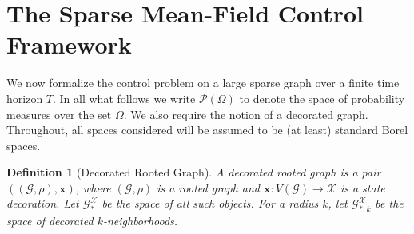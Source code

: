 \documentclass{article}
\newtheorem{definition}{Definition}
\begin{document}
\section{The Sparse Mean-Field Control Framework}
\label{sec:sparse_framework}
We now formalize the control problem on a large sparse graph over a finite time horizon $T$. In all what follows we write $\mathcal{P}(\Omega)$ to denote the space of probability measures over the set $\Omega$.
We also require the notion of a decorated graph. Throughout, all spaces considered will be assumed to be (at least) standard Borel spaces.
\begin{definition}[Decorated Rooted Graph]
A decorated rooted graph is a pair $((\mathcal{G}, \rho), \mathbf{x})$, where $(\mathcal{G}, \rho)$ is a rooted graph and $\mathbf{x}: V(\mathcal{G}) \to \mathcal{X}$ is a state decoration. Let $\mathcal{G}_*^{\mathcal{X}}$ be the space of all such objects. For a radius $k$, let $\mathcal{G}_{*,k}^{\mathcal{X}}$ be the space of decorated $k$-neighborhoods.
\end{definition}
\end{document}

